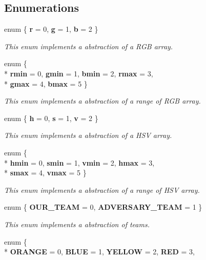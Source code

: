 \subsection*{Enumerations}
\begin{DoxyCompactItemize}
\item 
enum \{ {\bfseries r} = 0, 
{\bfseries g} = 1, 
{\bfseries b} = 2
 \}
\begin{DoxyCompactList}\small\item\em This enum implements a abstraction of a R\-G\-B array. \end{DoxyCompactList}\item 
enum \{ \\*
{\bfseries rmin} = 0, 
{\bfseries gmin} = 1, 
{\bfseries bmin} = 2, 
{\bfseries rmax} = 3, 
\\*
{\bfseries gmax} = 4, 
{\bfseries bmax} = 5
 \}
\begin{DoxyCompactList}\small\item\em This enum implements a abstraction of a range of R\-G\-B array. \end{DoxyCompactList}\item 
enum \{ {\bfseries h} = 0, 
{\bfseries s} = 1, 
{\bfseries v} = 2
 \}
\begin{DoxyCompactList}\small\item\em This enum implements a abstraction of a H\-S\-V array. \end{DoxyCompactList}\item 
enum \{ \\*
{\bfseries hmin} = 0, 
{\bfseries smin} = 1, 
{\bfseries vmin} = 2, 
{\bfseries hmax} = 3, 
\\*
{\bfseries smax} = 4, 
{\bfseries vmax} = 5
 \}
\begin{DoxyCompactList}\small\item\em This enum implements a abstraction of a range of H\-S\-V array. \end{DoxyCompactList}\item 
enum \{ {\bfseries O\-U\-R\-\_\-\-T\-E\-A\-M} = 0, 
{\bfseries A\-D\-V\-E\-R\-S\-A\-R\-Y\-\_\-\-T\-E\-A\-M} = 1
 \}
\begin{DoxyCompactList}\small\item\em This enum implements a abstraction of teams. \end{DoxyCompactList}\item 
enum \{ \\*
{\bfseries O\-R\-A\-N\-G\-E} = 0, 
{\bfseries B\-L\-U\-E} = 1, 
{\bfseries Y\-E\-L\-L\-O\-W} = 2, 
{\bfseries R\-E\-D} = 3, 

\end{DoxyCompactItemize}
